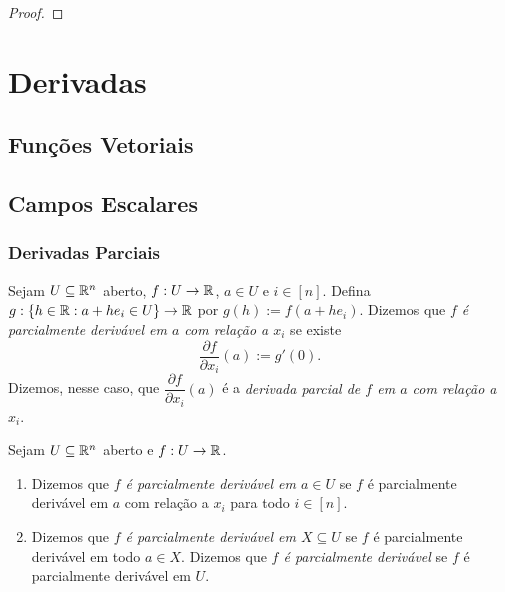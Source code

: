 \begin{proof}
    \blackproof
\end{proof}

\chapter{Derivadas}

\section{Funções Vetoriais}

\section{Campos Escalares}

\subsection{Derivadas Parciais}

\begin{definition}
    Sejam $U \subseteq \mathbb{R}^n$ aberto, $f : U \to \mathbb{R}$, $a \in U$ e $i \in [n]$. Defina $g :\{h \in \mathbb{R} : a + h e_i \in U \} \to \mathbb{R}$ por $g(h) := f(a + h e_i)$. Dizemos que \emph{$f$ é parcialmente derivável em $a$ com relação a $x_i$} se existe
        \[
            \dfrac{\partial f}{\partial x_i} (a) := g'(0).
        \]
    Dizemos, nesse caso, que $\dfrac{\partial f}{\partial x_i} (a)$ é a \emph{derivada parcial de $f$ em $a$ com relação a $x_i$}.
\end{definition}

\begin{definition}
    Sejam $U \subseteq \mathbb{R}^n$ aberto e $f : U \to \mathbb{R}$.
        \begin{enumerate}[leftmargin=*, align=left, label=\textbf{(\alph*)}]
            \item Dizemos que \emph{$f$ é parcialmente derivável em $a \in U$} se $f$ é parcialmente derivável em $a$ com relação a $x_i$ para todo $i \in [n]$.
            \item Dizemos que \emph{$f$ é parcialmente derivável em $X \subseteq U$} se $f$ é parcialmente derivável em todo $a \in X$. Dizemos que \emph{$f$ é parcialmente derivável} se $f$ é parcialmente derivável em $U$.
        \end{enumerate}
\end{definition}


